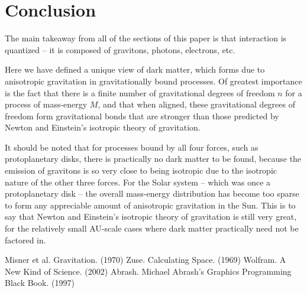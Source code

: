 \documentclass[12pt]{article}
\begin{document}
{\section{Conclusion}

The main takeaway from all of the sections of this paper is that interaction is quantized -- it is composed of gravitons, photons, electrons, etc. 

Here we have defined a unique view of dark matter, which forms due to anisotropic gravitation in gravitationally bound processes.
Of greatest importance is the fact that there is a finite number of gravitational degrees of freedom $n$ for a process of mass-energy $M$, and that when aligned, these gravitational degrees of freedom form gravitational bonds that are stronger than those predicted by Newton and Einstein's isotropic theory of gravitation.

It should be noted that for processes bound by all four forces, such as protoplanetary disks, there is practically no dark matter to be found, because the emission of gravitons is so very close to being isotropic due to the isotropic nature of the other three forces.
For the Solar system -- which was once a protoplanetary disk -- the overall mass-energy distribution has become too sparse to form any appreciable amount of anisotropic gravitation in the Sun.
This is to say that Newton and Einstein's isotropic theory of gravitation is still very great, for the relatively small AU-scale cases where dark matter practically need not be factored in.







\pagebreak





\begin{thebibliography}{9}
 Misner et al. Gravitation. (1970)
 Zuse. Calculating Space. (1969)
 Wolfram. A New Kind of Science. (2002)
 Abrash. Michael Abrash's Graphics Programming Black Book. (1997)


\end{thebibliography}}
\end{document}
